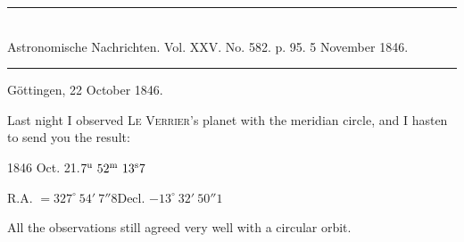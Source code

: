 \clearpage
\hypertarget{native-476-letter}{}
\begin{center}
\rule{0.55\linewidth}{0.4pt}\\[2pt]
Astronomische Nachrichten. Vol. XXV. No. 582. p. 95. 5 November 1846.\\[2pt]
\rule{0.55\linewidth}{0.4pt}
\end{center}
\begin{flushright}Göttingen, 22 October 1846.\end{flushright}

Last night I observed \textsc{Le Verrier}’s planet with the meridian circle, and I hasten to send you the result:

\begin{center}
1846 Oct. 21.\quad $7^{\rm u}\ 52^{\rm m}\ 13^{\rm s}7$\par
R.A. $=327^\circ\ 54'\ 7''8$\qquad Decl. $-13^\circ\ 32'\ 50''1$
\end{center}

All the observations still agreed very well with a circular orbit.
